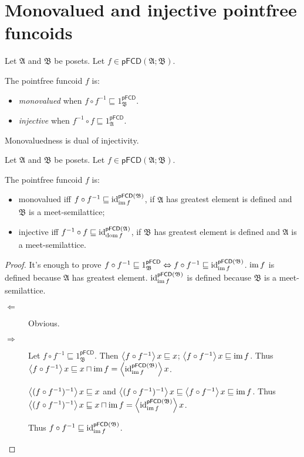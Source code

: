 \section{Monovalued and injective pointfree funcoids}
\begin{defn}
Let $\mathfrak{A}$ and $\mathfrak{B}$ be posets. Let $f\in\mathsf{pFCD}(\mathfrak{A};\mathfrak{B})$.

The pointfree funcoid $f$ is:
\begin{itemize}
\item {}\emph{monovalued} when $f\circ f^{-1}\sqsubseteq1_{\mathfrak{B}}^{\mathsf{pFCD}}$.
\item {}\emph{injective} when $f^{-1}\circ f\sqsubseteq1_{\mathfrak{A}}^{\mathsf{pFCD}}$.
\end{itemize}
\end{defn}
Monovaluedness is dual of injectivity.
\begin{prop}
Let $\mathfrak{A}$ and $\mathfrak{B}$ be posets. Let $f\in\mathsf{pFCD}(\mathfrak{A};\mathfrak{B})$.

The pointfree funcoid $f$ is:
\begin{itemize}
\item monovalued iff $f\circ f^{-1}\sqsubseteq\operatorname{id}_{\operatorname{im} f}^{\mathsf{pFCD}(\mathfrak{B})}$,
if $\mathfrak{A}$ has greatest element is defined and $\mathfrak{B}$ is a meet-semilattice;
\item injective iff $f^{-1}\circ f\sqsubseteq\operatorname{id}_{\operatorname{dom} f}^{\mathsf{pFCD}(\mathfrak{A})}$,
if $\mathfrak{B}$ has greatest element is defined and $\mathfrak{A}$ is a meet-semilattice. 
\end{itemize}
\end{prop}
\begin{proof}
It's enough to prove $f\circ f^{-1}\sqsubseteq1_{\mathfrak{B}}^{\mathsf{pFCD}}\Leftrightarrow f\circ f^{-1}\sqsubseteq\operatorname{id}_{\operatorname{im} f}^{\mathsf{pFCD}(\mathfrak{B})}$.
$\operatorname{im} f$ is defined because $\mathfrak{A}$ has greatest element. $\operatorname{id}_{\operatorname{im} f}^{\mathsf{pFCD}(\mathfrak{B})}$ is defined because $\mathfrak{B}$ is a meet-semilattice.
\begin{description}
\item [{$\Leftarrow$}] Obvious.
\item [{$\Rightarrow$}] Let $f\circ f^{-1}\sqsubseteq1_{\mathfrak{B}}^{\mathsf{pFCD}}$.
Then $\left\langle f\circ f^{-1}\right\rangle x\sqsubseteq x$; $\left\langle f\circ f^{-1}\right\rangle x\sqsubseteq\operatorname{im} f$.
Thus $\left\langle f\circ f^{-1}\right\rangle x\sqsubseteq x\sqcap\operatorname{im} f=\left\langle \operatorname{id}_{\operatorname{im} f}^{\mathsf{pFCD}(\mathfrak{B})}\right\rangle x$.


$\left\langle (f\circ f^{-1})^{-1}\right\rangle x\sqsubseteq x$ and $\left\langle (f\circ f^{-1})^{-1}\right\rangle x\sqsubseteq\left\langle f\circ f^{-1}\right\rangle x\sqsubseteq\operatorname{im} f$.
Thus $\left\langle (f\circ f^{-1})^{-1}\right\rangle x\sqsubseteq x\sqcap\operatorname{im} f=\left\langle \operatorname{id}_{\operatorname{im} f}^{\mathsf{pFCD}(\mathfrak{B})}\right\rangle x$.


Thus $f\circ f^{-1}\sqsubseteq\operatorname{id}_{\operatorname{im} f}^{\mathsf{pFCD}(\mathfrak{B})}$.

\end{description}
\end{proof}

